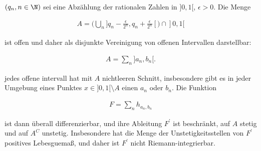 
\begin{exercise}

$(q_n, n \in \N)$ sei eine Abzählung der rationalen Zahlen in $]0, 1[$, $\epsilon > 0$.
Die Menge

\begin{align*}
    A = (\bigcup_n ]q_n - \frac{\epsilon}{2^n}, q_n + \frac{\epsilon}{2^n}[) \cap ]0, 1[
\end{align*}

ist offen und daher als disjunkte Vereinigung von offenen Intervallen darstellbar:

\begin{align*}
    A = \sum_n ]a_n, b_n[.
\end{align*}

jedes offene intervall hat mit $A$ nichtleeren Schnitt, insbesondere gibt es in jeder Umgebung eines Punktes $x \in ]0, 1[ \setminus A$ einen $a_n$ oder $b_n$.
Die Funktion

\begin{align*}
    F = \sum_n h_{a_n, b_n}
\end{align*}

ist dann überall differenzierbar, und ihre Ableitung $F^\prime$ ist beschränkt, auf $A$ stetig und auf $A^C$ unstetig.
Insbesondere hat die Menge der Unstetigkeitsstellen von $F^\prime$ positives Lebesguemaß, und daher ist $F^\prime$ nicht Riemann-integrierbar.

\end{exercise}


